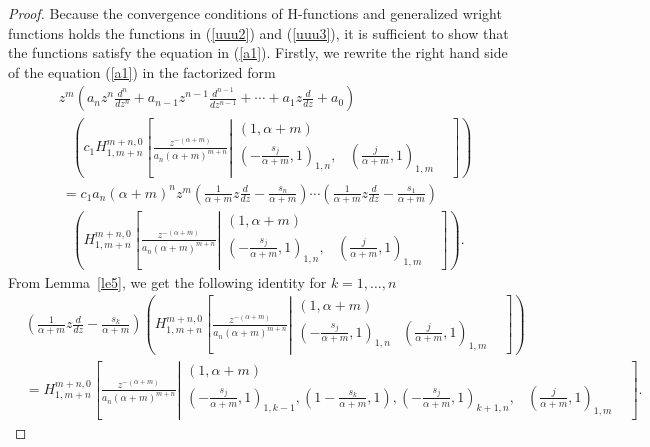 \documentclass[10pt,a4paper]{amsart}
\begin{document}
\begin{proof}
Because the convergence
conditions of H-functions and generalized wright functions holds the functions in (\ref{uuu2}) and (\ref{uuu3}), it is sufficient to show that the functions satisfy the equation in (\ref{a1}).
Firstly, we rewrite the right hand side of the equation (\ref{a1}) in the factorized form
\begin{align}\label{uuu5}
    & z^{m}\left(a_nz^n\frac{d^n}{dz^n}+a_{n-1}z^{n-1}\frac{d^{n-1}}{dz^{n-1}}+\cdots+ a_1z\frac{d}{dz} +a_0\right)\nonumber\\
    &~~~~\left( c_1H_{1,m+n}^{m+n,0} \left[ \frac{z^{-(\alpha+m)}}{a_n(\alpha+m)^{m+n}} \left| \begin{matrix}
( 1 , \alpha+m )  \\
 \left( -\frac{s_j}{\alpha+m} , 1 \right)_{1,n}, & \left(\frac{j}{\alpha+m} , 1  \right)_{1,m} &  \end{matrix}\right.\right]\right)\nonumber\\ 
    &~=c_1a_n(\alpha+m)^n z^m\left(\frac{1}{\alpha+m}z\frac{d}{dz}-\frac{s_n}{\alpha+m}\right)\cdots\left(\frac{1}{\alpha+m}z\frac{d}{dz}-\frac{s_1}{\alpha+m}\right)\nonumber\\
    & ~~~~\left( H_{1,m+n}^{m+n,0} \left[ \frac{z^{-(\alpha+m)}}{a_n(\alpha+m)^{m+n}} \left| \begin{matrix}
( 1 , \alpha+m )  \\
 \left( -\frac{s_j}{\alpha+m} , 1 \right)_{1,n}, & \left(\frac{j}{\alpha+m} , 1  \right)_{1,m} &  \end{matrix}\right.\right]\right).
\end{align}
From Lemma~\ref{le5}, we get the following identity for $k=1,\ldots, n$
\begin{align*}
& \left(\frac{1}{\alpha+m}z\frac{d}{dz}-\frac{s_k}{\alpha+m}\right)\left(H_{1,m+n}^{m+n,0} \left[ \frac{z^{-(\alpha+m)}}{a_n(\alpha+m)^{m+n}} \left| \begin{matrix}
( 1 , \alpha+m )  \\
\left( -\frac{s_j}{\alpha+m} , 1 \right)_{1,n}& \left(\frac{j}{\alpha+m} , 1  \right)_{1,m} &  \end{matrix}\right.\right]\right)\\
&=H_{1,m+n}^{m+n,0} \left[ \frac{z^{-(\alpha+m)}}{a_n(\alpha+m)^{m+n}} \left| \begin{matrix}
( 1 , \alpha+m )  \\
\left( -\frac{s_j}{\alpha+m} , 1 \right)_{1,k-1}, \left(1 -\frac{s_k}{\alpha+m} , 1 \right), \left( -\frac{s_j}{\alpha+m} , 1 \right)_{k+1,n}, & \left(\frac{j}{\alpha+m} , 1  \right)_{1,m} &  \end{matrix}\right.\right].

\end{align*}
\end{proof}
\end{document}
